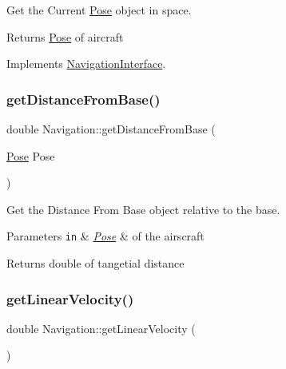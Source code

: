 Get the Current \hyperlink{structPose}{Pose} object in space. 

\begin{DoxyReturn}{Returns}
\hyperlink{structPose}{Pose} of aircraft 
\end{DoxyReturn}


Implements \hyperlink{classNavigationInterface_ab37e23f5f838c02d7768d2f02b1fe429}{Navigation\+Interface}.

\mbox{\label{classNavigation_ac417c0408968151493e5dccefae38bc7}} 
\subsubsection{\texorpdfstring{get\+Distance\+From\+Base()}{getDistanceFromBase()}}
{\footnotesize\ttfamily double Navigation\+::get\+Distance\+From\+Base (\begin{DoxyParamCaption}\item[{\hyperlink{structPose}{Pose}}]{Pose }\end{DoxyParamCaption})}



Get the Distance From Base object relative to the base. 


\begin{DoxyParams}[1]{Parameters}
\mbox{\tt in}  & {\em \hyperlink{structPose}{Pose}} & of the airscraft \\
\hline
\end{DoxyParams}
\begin{DoxyReturn}{Returns}
double of tangetial distance 
\end{DoxyReturn}
\mbox{\label{classNavigation_a9aef484e223556a207734159612fb2c9}} 
\subsubsection{\texorpdfstring{get\+Linear\+Velocity()}{getLinearVelocity()}}
{\footnotesize\ttfamily double Navigation\+::get\+Linear\+Velocity (\begin{DoxyParamCaption}{ }\end{DoxyParamCaption})\hspace{0.3cm}{\ttfamily [virtual]}}



